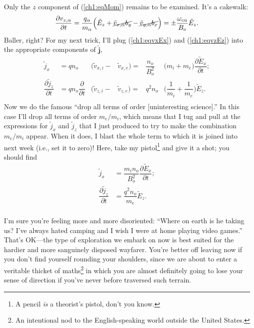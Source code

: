 Only the $z$ component of (\ref{ch1:eqMom}) remains to be examined. It's a cakewalk:
\begin{equation} \label{ch1:eqvzEz} \dfrac{\partial v_{z,\alpha}}{\partial t} =
  \dfrac{q_\alpha}{m_\alpha} \Big ( \tilde E_z + \cancel{\tilde v_{x,\alpha} b_y} -
  \cancel{\tilde v_{y,\alpha} b_x} \Big ) = \pm \dfrac{\omega_{c \alpha}}{B_o} \tilde E_z.
\end{equation}
Baller, right? For my next trick, I'll plug (\ref{ch1:eqvxEx}) and
(\ref{ch1:eqvzEz}) into the appropriate components of $\mathbf{\tilde j}$,
\begin{equation*} 
  \begin{alignedat}{4}
    \tilde j_x                              &= q n_o &\Big ( \tilde v_{x,i} - & \tilde v_{x,e} \Big ) = & \dfrac{n_o}{B_o^2} &\Big( m_i + m_e \Big) \dfrac{\partial \tilde E_x}{\partial t}; \\
    \dfrac{\partial \tilde j_z}{\partial t} &= q n_o \dfrac{\partial}{\partial t} &\Big ( \tilde v_{z,i} - & \tilde v_{z,e} \Big ) =& q^2 n_o &\Big( \dfrac{1}{m_i} + \dfrac{1}{m_e} \Big) \tilde E_z. \\
  \end{alignedat}
\end{equation*}
Now we do the famous ``drop all terms of order [uninteresting science].'' In
this case I'll drop all terms of order $m_e/m_i$, which means that I tug and
pull at the expressions for $\tilde j_x$ and $\tilde j_z$ that I just produced
to try to make the combination $m_e/m_i$ appear. When it does, I blast the whole
term to which it is joined into next week (i.e., set it to zero)! Here, take my
pistol\footnote{A pencil \emph{is} a theorist's pistol, don't you know.} and
give it a shot; you should find
\begin{equation} \label{ch1:eqDaddy}
  \begin{alignedat}{4}
    \tilde j_x                              &= \dfrac{m_i n_o }{B_o^2} \dfrac{\partial \tilde E_x}{\partial t}; \\
    \dfrac{\partial \tilde j_z}{\partial t} &= \dfrac{q^2 n_o }{m_e} \tilde E_z. \\
  \end{alignedat}
\end{equation}

I'm sure you're feeling more and more disoriented: ``Where on earth is he taking
us? I've always hated camping and I wish I were at home playing video games.''
That's OK---the type of exploration we embark on now is best suited for the
hardier and more sanguinely disposed wayfarer. You're better off leaving now if
you don't find yourself rounding your shoulders, since we are about to enter a
veritable thicket of maths\footnote{An intentional nod to the English-speaking
  world outside the United States.} in which you are almost definitely going to
lose your sense of direction if you've never before traversed such terrain.

